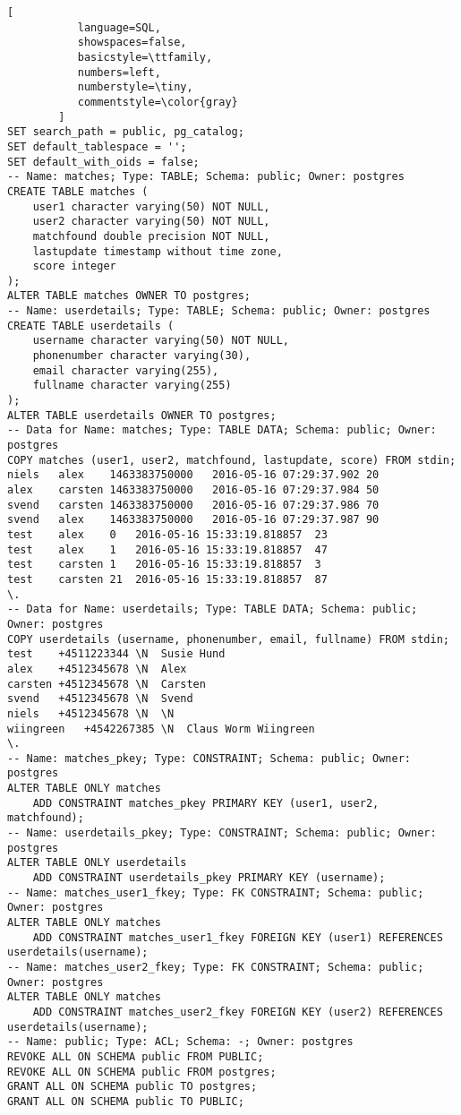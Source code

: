 \begin{lstlisting}[
           language=SQL,
           showspaces=false,
           basicstyle=\ttfamily,
           numbers=left,
           numberstyle=\tiny,
           commentstyle=\color{gray}
        ]
SET search_path = public, pg_catalog;
SET default_tablespace = '';
SET default_with_oids = false;
-- Name: matches; Type: TABLE; Schema: public; Owner: postgres
CREATE TABLE matches (
    user1 character varying(50) NOT NULL,
    user2 character varying(50) NOT NULL,
    matchfound double precision NOT NULL,
    lastupdate timestamp without time zone,
    score integer
);
ALTER TABLE matches OWNER TO postgres;
-- Name: userdetails; Type: TABLE; Schema: public; Owner: postgres
CREATE TABLE userdetails (
    username character varying(50) NOT NULL,
    phonenumber character varying(30),
    email character varying(255),
    fullname character varying(255)
);
ALTER TABLE userdetails OWNER TO postgres;
-- Data for Name: matches; Type: TABLE DATA; Schema: public; Owner: postgres
COPY matches (user1, user2, matchfound, lastupdate, score) FROM stdin;
niels	alex	1463383750000	2016-05-16 07:29:37.902	20
alex	carsten	1463383750000	2016-05-16 07:29:37.984	50
svend	carsten	1463383750000	2016-05-16 07:29:37.986	70
svend	alex	1463383750000	2016-05-16 07:29:37.987	90
test	alex	0	2016-05-16 15:33:19.818857	23
test	alex	1	2016-05-16 15:33:19.818857	47
test	carsten	1	2016-05-16 15:33:19.818857	3
test	carsten	21	2016-05-16 15:33:19.818857	87
\.
-- Data for Name: userdetails; Type: TABLE DATA; Schema: public; Owner: postgres
COPY userdetails (username, phonenumber, email, fullname) FROM stdin;
test	+4511223344	\N	Susie Hund
alex	+4512345678	\N	Alex
carsten	+4512345678	\N	Carsten
svend	+4512345678	\N	Svend
niels	+4512345678	\N	\N
wiingreen	+4542267385	\N	Claus Worm Wiingreen
\.
-- Name: matches_pkey; Type: CONSTRAINT; Schema: public; Owner: postgres
ALTER TABLE ONLY matches
    ADD CONSTRAINT matches_pkey PRIMARY KEY (user1, user2, matchfound);
-- Name: userdetails_pkey; Type: CONSTRAINT; Schema: public; Owner: postgres
ALTER TABLE ONLY userdetails
    ADD CONSTRAINT userdetails_pkey PRIMARY KEY (username);
-- Name: matches_user1_fkey; Type: FK CONSTRAINT; Schema: public; Owner: postgres
ALTER TABLE ONLY matches
    ADD CONSTRAINT matches_user1_fkey FOREIGN KEY (user1) REFERENCES userdetails(username);
-- Name: matches_user2_fkey; Type: FK CONSTRAINT; Schema: public; Owner: postgres
ALTER TABLE ONLY matches
    ADD CONSTRAINT matches_user2_fkey FOREIGN KEY (user2) REFERENCES userdetails(username);
-- Name: public; Type: ACL; Schema: -; Owner: postgres
REVOKE ALL ON SCHEMA public FROM PUBLIC;
REVOKE ALL ON SCHEMA public FROM postgres;
GRANT ALL ON SCHEMA public TO postgres;
GRANT ALL ON SCHEMA public TO PUBLIC;
\end{lstlisting}